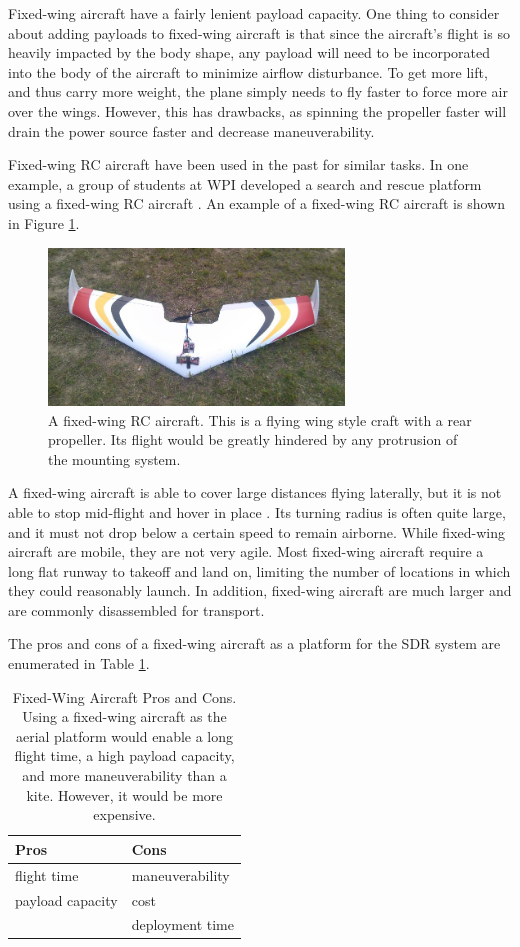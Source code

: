 Fixed-wing aircraft have a fairly lenient payload capacity. One thing to consider about adding payloads to fixed-wing aircraft is that since the aircraft’s flight is so heavily impacted by the body shape, any payload will need to be incorporated into the body of the aircraft to minimize airflow disturbance. To get more lift, and thus carry more weight, the plane simply needs to fly faster to force more air over the wings. However, this has drawbacks, as spinning the propeller faster will drain the power source faster and decrease maneuverability.\par
Fixed-wing RC aircraft have been used in the past for similar tasks. In one example, a group of students at WPI developed a search and rescue platform using a fixed-wing RC aircraft \cite{airplane_iqp}. An example of a fixed-wing RC aircraft is shown in Figure \ref{fig:fixed_wing}.
\begin{figure}[ht]
\centering
\includegraphics[width=0.70\textwidth]{img/fixed-wing.jpg}
\caption{A fixed-wing RC aircraft. This is a flying wing style craft with a rear propeller. Its flight would be greatly hindered by any protrusion of the mounting system. \cite{airplane_iqp}}
\label{fig:fixed_wing}
\end{figure}\par
A fixed-wing aircraft is able to cover large distances flying laterally, but it is not able to stop mid-flight and hover in place \cite{airplane_book}. Its turning radius is often quite large, and it must not drop below a certain speed to remain airborne. While fixed-wing aircraft are mobile, they are not very agile. Most fixed-wing aircraft require a long flat runway to takeoff and land on, limiting the number of locations in which they could reasonably launch. In addition, fixed-wing aircraft are much larger and are commonly disassembled for transport.\par
The pros and cons of a fixed-wing aircraft as a platform for the SDR system are enumerated in Table \ref{table:wing_pc}.
\begin{table}[ht]
\centering
\caption{Fixed-Wing Aircraft Pros and Cons. Using a fixed-wing aircraft as the aerial platform would enable a long flight time, a high payload capacity, and more maneuverability than a kite. However, it would be more expensive.}
\label{table:wing_pc}
\begin{tabular}{l|l}
  Pros & Cons \\ \hline
  flight time & maneuverability \\
  payload capacity & cost \\
   & deployment time \\
\end{tabular}
\end{table}\par

